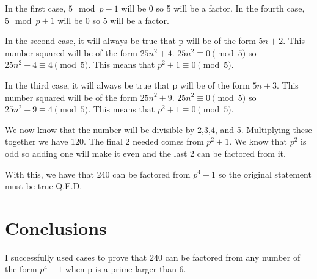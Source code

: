 \documentclass{article}
\begin{document}
In the first case, $5 \mod p-1$ will be 0 so 5 will be a factor.
In the fourth case, $5 \mod p+1$ will be 0 so 5 will be a factor.

In the second case, it will always be true that p will be of the form $5n + 2$. This number squared will be of the form $25n^2 + 4$. $25n^2 \equiv 0 \pmod{5}$ so $25n^2 +4 \equiv 4 \pmod{5}$. This means that $p^2 +1 \equiv 0 \pmod{5}$.

In the third case, it will always be true that p will be of the form $5n + 3$. This number squared will be of the form $25n^2 + 9$. $25n^2 \equiv 0 \pmod{5}$ so $25n^2 +9 \equiv 4 \pmod{5}$. This means that $p^2 +1 \equiv 0 \pmod{5}$.\cite{stack}

We now know that the number will be divisible by 2,3,4, and 5. Multiplying these together we have 120. The final 2 needed comes from $p^2+1$. We know that $p^2$ is odd so adding one will make it even and the last 2 can be factored from it.

With this, we have that 240 can be factored from $p^4 - 1$ so the original statement must be true Q.E.D.

\section{Conclusions}
I successfully used cases to prove that 240 can be factored from any number of the form $p^4 - 1$ when p is a prime larger than 6.



\end{document}

